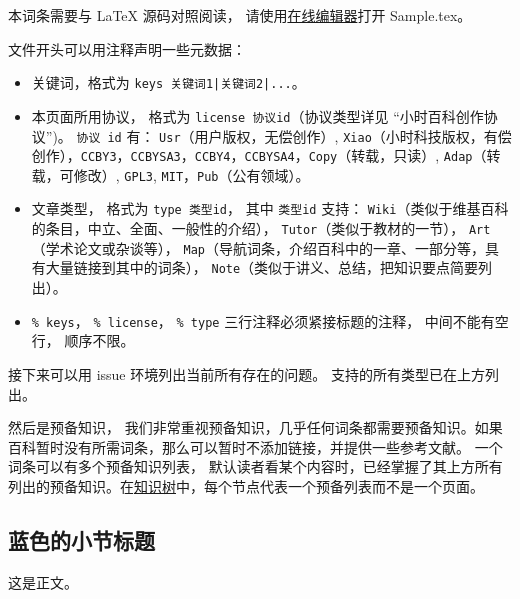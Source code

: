 
\begin{issues}
\issueDraft       %
\issueTODO        %
\issueMissDepend  %
\issueAbstract    %
\issueNeedCite    %
\issueAi          %
\issueAiRaw       %
\end{issues}


本词条需要与 LaTeX 源码对照阅读， 请使用\href{https://wuli.wiki/editor}{在线编辑器}打开 Sample.tex。

文件开头可以用注释声明一些元数据：
\begin{itemize}
\item 关键词，格式为 \verb`keys 关键词1|关键词2|...`。
\item 本页面所用协议， 格式为 \verb|license 协议id|（协议类型详见 “小时百科创作协议”)。 \verb|协议 id| 有： \verb|Usr|（用户版权，无偿创作）, \verb|Xiao|（小时科技版权，有偿创作），\verb|CCBY3|，\verb|CCBYSA3|，\verb|CCBY4|，\verb|CCBYSA4|，\verb|Copy|（转载，只读）, \verb|Adap|（转载，可修改）, \verb|GPL3|, \verb|MIT|，\verb|Pub|（公有领域）。
\item 文章类型， 格式为 \verb|type 类型id|， 其中 \verb|类型id| 支持： \verb|Wiki|（类似于维基百科的条目，中立、全面、一般性的介绍）， \verb|Tutor|（类似于教材的一节）， \verb|Art|（学术论文或杂谈等）， \verb|Map|（导航词条，介绍百科中的一章、一部分等，具有大量链接到其中的词条）， \verb|Note|（类似于讲义、总结，把知识要点简要列出）。
\item \verb|% keys|， \verb|% license|， \verb|% type| 三行注释必须紧接标题的注释， 中间不能有空行， 顺序不限。
\end{itemize}

接下来可以用 issue 环境列出当前所有存在的问题。 支持的所有类型已在上方列出。

然后是预备知识， 我们非常重视预备知识，几乎任何词条都需要预备知识。如果百科暂时没有所需词条，那么可以暂时不添加链接，并提供一些参考文献。 一个词条可以有多个预备知识列表， 默认读者看某个内容时，已经掌握了其上方所有列出的预备知识。在\href{https://wuli.wiki/tree/}{知识树}中，每个节点代表一个预备列表而不是一个页面。

\subsection{蓝色的小节标题}
这是正文。
